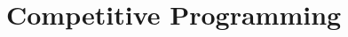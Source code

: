 \documentclass[../../main.tex]{subfiles}
\begin{document}
\part{Competitive Programming}
\localtableofcontents











\end{document}
